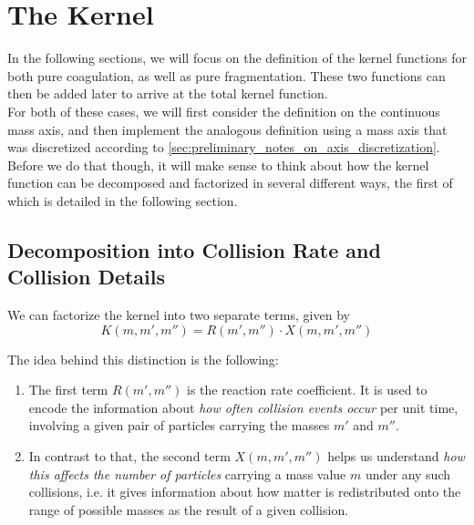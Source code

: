 \clearpage\section{The Kernel}
    
        In the following sections, we will focus on the definition of the kernel functions 
        for both pure coagulation, as well as pure fragmentation. These two functions can 
        then be added later to arrive at the total kernel function. \\

        For both of these cases, we will first consider the definition on the continuous 
        mass axis, and then implement the analogous definition using a mass axis 
        that was discretized according to \cref{sec:preliminary_notes_on_axis_discretization}. 
        Before we do that though, it will make sense to think about how the kernel function can be 
        decomposed and factorized in several different ways, the first of which 
        is detailed in the following section. 


    \subsection{Decomposition into Collision Rate and Collision Details}
    
        We can factorize the kernel into two separate terms, given by
        \begin{equation}
            K(m, m', m'') = R(m', m'') \cdot X(m, m', m'') 
        \end{equation}
    
        The idea behind this distinction is the following: 
        \begin{enumerate}
    
            \item The first term $R(m',m'')$ is the reaction rate coefficient. It is used to 
                encode the information about \textit{how often collision events occur}
                per unit time, involving a given pair of particles carrying the masses $m'$ 
                and $m''$.
    
            \item In contrast to that, the second term $X(m,m',m'')$ helps us understand 
                \textit{how this affects the number of particles} carrying a mass value $m$ 
                under any such collisions, i.e. it gives information about how matter is 
                redistributed onto the range of possible masses as the result of a given 
                collision.
    
        \end{enumerate}
    
